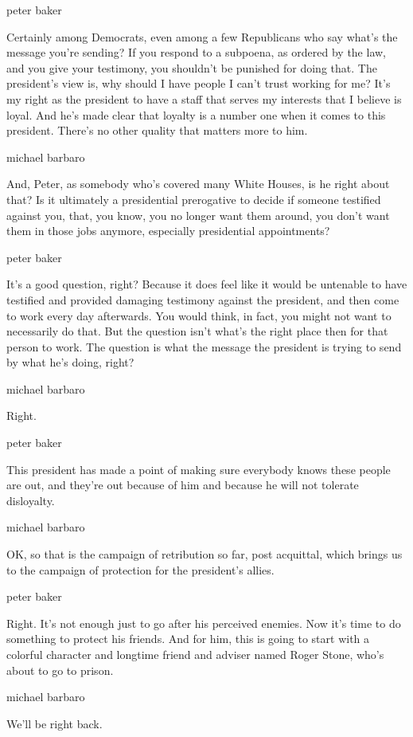 peter baker

Certainly among Democrats, even among a few Republicans who say what's
the message you're sending? If you respond to a subpoena, as ordered by
the law, and you give your testimony, you shouldn't be punished for
doing that. The president's view is, why should I have people I can't
trust working for me? It's my right as the president to have a staff
that serves my interests that I believe is loyal. And he's made clear
that loyalty is a number one when it comes to this president. There's no
other quality that matters more to him.

michael barbaro

And, Peter, as somebody who's covered many White Houses, is he right
about that? Is it ultimately a presidential prerogative to decide if
someone testified against you, that, you know, you no longer want them
around, you don't want them in those jobs anymore, especially
presidential appointments?

peter baker

It's a good question, right? Because it does feel like it would be
untenable to have testified and provided damaging testimony against the
president, and then come to work every day afterwards. You would think,
in fact, you might not want to necessarily do that. But the question
isn't what's the right place then for that person to work. The question
is what the message the president is trying to send by what he's doing,
right?

michael barbaro

Right.

peter baker

This president has made a point of making sure everybody knows these
people are out, and they're out because of him and because he will not
tolerate disloyalty.

michael barbaro

OK, so that is the campaign of retribution so far, post acquittal, which
brings us to the campaign of protection for the president's allies.

peter baker

Right. It's not enough just to go after his perceived enemies. Now it's
time to do something to protect his friends. And for him, this is going
to start with a colorful character and longtime friend and adviser named
Roger Stone, who's about to go to prison.

michael barbaro

We'll be right back.

